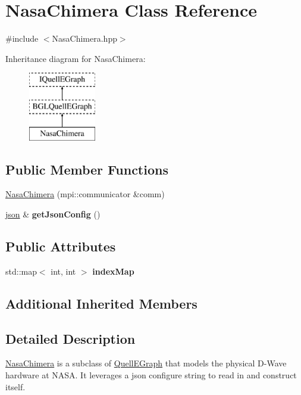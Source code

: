 \hypertarget{a00089}{}\section{Nasa\+Chimera Class Reference}
\label{a00089}


{\ttfamily \#include $<$Nasa\+Chimera.\+hpp$>$}

Inheritance diagram for Nasa\+Chimera\+:\begin{figure}[H]
\begin{center}
\leavevmode
\includegraphics[height=3.000000cm]{a00089}
\end{center}
\end{figure}
\subsection*{Public Member Functions}
\begin{DoxyCompactItemize}
\item 
\hyperlink{a00089_a65634697fd572aeb83c51a0a62baaed5}{Nasa\+Chimera} (mpi\+::communicator \&comm)
\item 
\hyperlink{a00025}{json} \& {\bfseries get\+Json\+Config} ()\hypertarget{a00089_a630151064ad04f934a708ba69628b1f4}{}\label{a00089_a630151064ad04f934a708ba69628b1f4}

\end{DoxyCompactItemize}
\subsection*{Public Attributes}
\begin{DoxyCompactItemize}
\item 
std\+::map$<$ int, int $>$ {\bfseries index\+Map}\hypertarget{a00089_af611a712ed6448df899b867da40fe968}{}\label{a00089_af611a712ed6448df899b867da40fe968}

\end{DoxyCompactItemize}
\subsection*{Additional Inherited Members}


\subsection{Detailed Description}
\hyperlink{a00089}{Nasa\+Chimera} is a subclass of \hyperlink{a00100}{Quell\+E\+Graph} that models the physical D-\/\+Wave hardware at N\+A\+SA. It leverages a json configure string to read in and construct itself.

